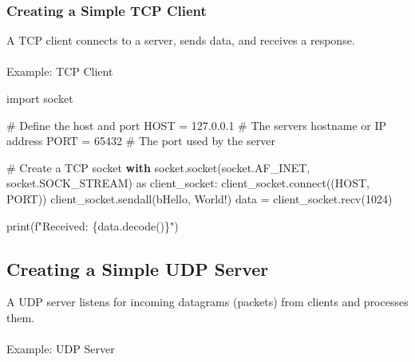 \documentclass[
  letterpaper,
  DIV=11,
  numbers=noendperiod]{scrreprt}
\makeatletter
\let\oldparagraph\paragraph
\renewcommand{\paragraph}{
    \@ifstar
      \xxxParagraphStar
      \xxxParagraphNoStar
  }
\newcommand{\xxxParagraphStar}[1]{\oldparagraph*{#1}\mbox{}}
\newcommand{\xxxParagraphNoStar}[1]{\oldparagraph{#1}\mbox{}}
\newenvironment{Shaded}{\begin{snugshade}}{\end{snugshade}}
\newcommand{\BuiltInTok}[1]{\textcolor[rgb]{0.00,0.23,0.31}{#1}}
\newcommand{\CommentTok}[1]{\textcolor[rgb]{0.37,0.37,0.37}{#1}}
\newcommand{\ControlFlowTok}[1]{\textcolor[rgb]{0.00,0.23,0.31}{\textbf{#1}}}
\newcommand{\DecValTok}[1]{\textcolor[rgb]{0.68,0.00,0.00}{#1}}
\newcommand{\ExtensionTok}[1]{\textcolor[rgb]{0.00,0.23,0.31}{#1}}
\newcommand{\ImportTok}[1]{\textcolor[rgb]{0.00,0.46,0.62}{#1}}
\newcommand{\NormalTok}[1]{\textcolor[rgb]{0.00,0.23,0.31}{#1}}
\newcommand{\OperatorTok}[1]{\textcolor[rgb]{0.37,0.37,0.37}{#1}}
\newcommand{\SpecialCharTok}[1]{\textcolor[rgb]{0.37,0.37,0.37}{#1}}
\newcommand{\SpecialStringTok}[1]{\textcolor[rgb]{0.13,0.47,0.30}{#1}}
\newcommand{\StringTok}[1]{\textcolor[rgb]{0.13,0.47,0.30}{#1}}
\makeatother
\begin{document}
\subsubsection{Creating a Simple TCP
Client}\label{creating-a-simple-tcp-client}

A TCP client connects to a server, sends data, and receives a response.

\paragraph{Example: TCP Client}\label{example-tcp-client}

\begin{Shaded}
\begin{Highlighting}[]
\ImportTok{import}\NormalTok{ socket}

\CommentTok{\# Define the host and port}
\NormalTok{HOST }\OperatorTok{=} \StringTok{\textquotesingle{}127.0.0.1\textquotesingle{}}  \CommentTok{\# The server\textquotesingle{}s hostname or IP address}
\NormalTok{PORT }\OperatorTok{=} \DecValTok{65432}        \CommentTok{\# The port used by the server}

\CommentTok{\# Create a TCP socket}
\ControlFlowTok{with}\NormalTok{ socket.socket(socket.AF\_INET, socket.SOCK\_STREAM) }\ImportTok{as}\NormalTok{ client\_socket:}
\NormalTok{    client\_socket.}\ExtensionTok{connect}\NormalTok{((HOST, PORT))}
\NormalTok{    client\_socket.sendall(}\StringTok{b\textquotesingle{}Hello, World!\textquotesingle{}}\NormalTok{)}
\NormalTok{    data }\OperatorTok{=}\NormalTok{ client\_socket.recv(}\DecValTok{1024}\NormalTok{)}

\BuiltInTok{print}\NormalTok{(}\SpecialStringTok{f"Received: }\SpecialCharTok{\{}\NormalTok{data}\SpecialCharTok{.}\NormalTok{decode()}\SpecialCharTok{\}}\SpecialStringTok{"}\NormalTok{)}
\end{Highlighting}
\end{Shaded}

\subsection{Creating a Simple UDP
Server}\label{creating-a-simple-udp-server}

A UDP server listens for incoming datagrams (packets) from clients and
processes them.

\paragraph{Example: UDP Server}\label{example-udp-server}
\end{document}
